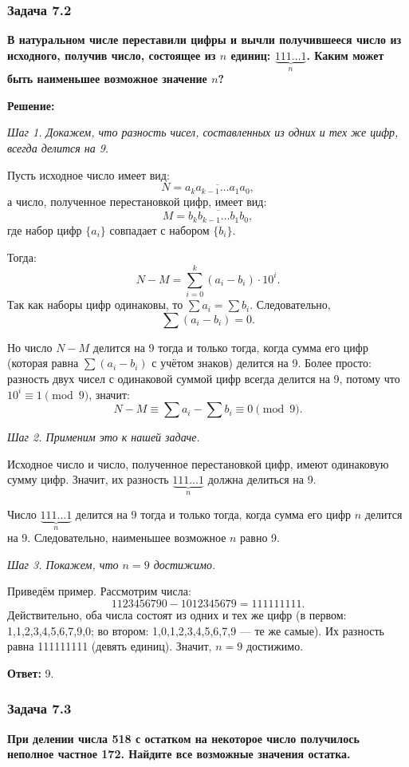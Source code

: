 \documentclass[12pt, a4paper]{article}
\begin{document}
\subsubsection*{Задача 7.2}
\textbf{В натуральном числе переставили цифры и вычли получившееся число из исходного, получив число, состоящее из $n$ единиц: $\underbrace{111\ldots1}_{n}$. Каким может быть наименьшее возможное значение $n$?}

\textbf{Решение:}

\textit{Шаг 1. Докажем, что разность чисел, составленных из одних и тех же цифр, всегда делится на 9.}

Пусть исходное число имеет вид:
\[
N = \overline{a_k a_{k-1} \ldots a_1 a_0},
\]
а число, полученное перестановкой цифр, имеет вид:
\[
M = \overline{b_k b_{k-1} \ldots b_1 b_0},
\]
где набор цифр $\{a_i\}$ совпадает с набором $\{b_i\}$.

Тогда:
\[
N - M = \sum_{i=0}^{k} (a_i - b_i) \cdot 10^i.
\]
Так как наборы цифр одинаковы, то $\sum a_i = \sum b_i$. Следовательно,
\[
\sum (a_i - b_i) = 0.
\]

Но число $N - M$ делится на 9 тогда и только тогда, когда сумма его цифр (которая равна $\sum (a_i - b_i)$ с учётом знаков) делится на 9. Более просто: разность двух чисел с одинаковой суммой цифр всегда делится на 9, потому что $10^i \equiv 1 \pmod{9}$, значит:
\[
N - M \equiv \sum a_i - \sum b_i \equiv 0 \pmod{9}.
\]

\textit{Шаг 2. Применим это к нашей задаче.}

Исходное число и число, полученное перестановкой цифр, имеют одинаковую сумму цифр. Значит, их разность $\underbrace{111\ldots1}_{n}$ должна делиться на 9.

Число $\underbrace{111\ldots1}_{n}$ делится на 9 тогда и только тогда, когда сумма его цифр $n$ делится на 9. Следовательно, наименьшее возможное $n$ равно 9.

\textit{Шаг 3. Покажем, что $n = 9$ достижимо.}

Приведём пример. Рассмотрим числа:
\[
1123456790 - 1012345679 = 111111111.
\]
Действительно, оба числа состоят из одних и тех же цифр (в первом: 1,1,2,3,4,5,6,7,9,0; во втором: 1,0,1,2,3,4,5,6,7,9 — те же самые). Их разность равна 111111111 (девять единиц). Значит, $n = 9$ достижимо.

\textbf{Ответ:} 9.

\subsubsection*{Задача 7.3}
\textbf{При делении числа 518 с остатком на некоторое число получилось неполное частное 172. Найдите все возможные значения остатка.}
\end{document}

